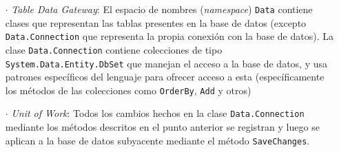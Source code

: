 \begin{enumerate}
  \item[\(\cdot\)] \textit{Table Data Gateway}: El espacio de nombres (\textit{namespace}) \lstinline|Data| contiene clases que representan las tablas presentes en la base de datos (excepto \lstinline|Data.Connection| que representa la propia conexión con la base de datos). La clase \lstinline|Data.Connection| contiene colecciones de tipo \lstinline|System.Data.Entity.DbSet| que manejan el acceso a la base de datos, y usa patrones específicos del lenguaje para ofrecer acceso a esta (específicamente los métodos de las colecciones como \lstinline|OrderBy|, \lstinline|Add| y otros)
  \item[\(\cdot\)] \textit{Unit of Work}: Todos los cambios hechos en la clase \lstinline|Data.Connection| mediante los métodos descritos en el punto anterior se registran y luego se aplican a la base de datos subyacente mediante el método \lstinline|SaveChanges|. 
\end{enumerate}
